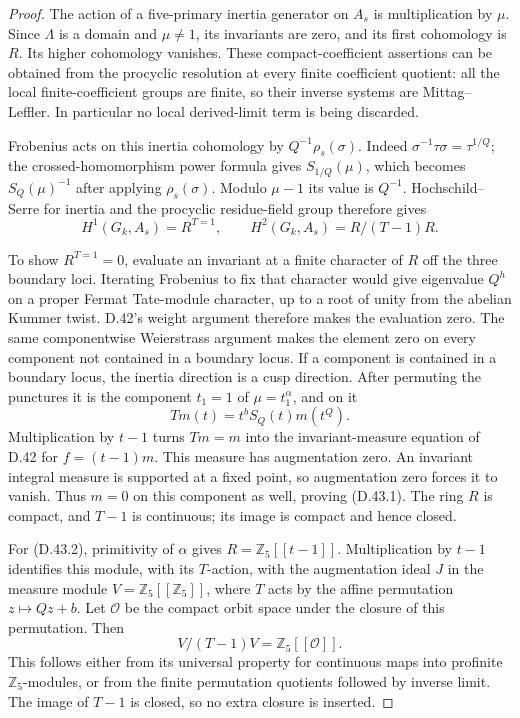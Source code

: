 \begin{proof}
The action of a five-primary inertia generator
on \(A_s\) is multiplication by \(\mu\).
Since \(\Lambda\) is a domain and \(\mu\ne1\),
its invariants are zero, and its first
cohomology is \(R\). Its higher cohomology
vanishes. These compact-coefficient assertions
can be obtained from the procyclic resolution
at every finite coefficient quotient:
all the local finite-coefficient groups are
finite, so their inverse systems are
Mittag--Leffler. In particular no local
derived-limit term is being discarded.

Frobenius acts on this inertia cohomology by
\(Q^{-1}\rho_s(\sigma)\).
Indeed \(\sigma^{-1}\tau\sigma=\tau^{1/Q}\);
the crossed-homomorphism power formula gives
\(S_{1/Q}(\mu)\), which becomes
\(S_Q(\mu)^{-1}\) after applying \(\rho_s(\sigma)\).
Modulo \(\mu-1\) its value is \(Q^{-1}\).
Hochschild--Serre for inertia and the
procyclic residue-field group therefore gives
\[
 H^1(G_k,A_s)=R^{T=1},\qquad
 H^2(G_k,A_s)=R/(T-1)R.
\]

To show \(R^{T=1}=0\), evaluate an invariant
at a finite character of \(R\) off the three
boundary loci. Iterating Frobenius to fix
that character would give eigenvalue \(Q^h\)
on a proper Fermat Tate-module character,
up to a root of unity from the abelian
Kummer twist. D.42's weight argument
therefore makes the evaluation zero.
The same componentwise Weierstrass argument
makes the element zero on every component
not contained in a boundary locus.
If a component is contained in a boundary
locus, the inertia direction is a cusp
direction. After permuting the punctures
it is the component \(t_1=1\) of
\(\mu=t_1^\alpha\), and on it
\[
                Tm(t)=t^bS_Q(t)m(t^Q).
\]
Multiplication by \(t-1\) turns \(Tm=m\)
into the invariant-measure equation of
D.42 for \(f=(t-1)m\). This measure has
augmentation zero. An invariant integral
measure is supported at a fixed point,
so augmentation zero forces it to vanish.
Thus \(m=0\) on this component as well,
proving (D.43.1). The ring \(R\) is compact,
and \(T-1\) is continuous; its image is
compact and hence closed.

For (D.43.2), primitivity of \(\alpha\)
gives \(R=\mathbb Z_5[[t-1]]\).
Multiplication by \(t-1\) identifies this
module, with its \(T\)-action, with the
augmentation ideal \(J\) in the measure
module \(V=\mathbb Z_5[[\mathbb Z_5]]\),
where \(T\) acts by the affine permutation
\(z\mapsto Qz+b\).
Let \(\mathcal O\) be the compact orbit
space under the closure of this permutation.
Then
\[
                     V/(T-1)V=\mathbb Z_5[[\mathcal O]].
                                                               \tag{D.43.3}
\]
This follows either from its universal
property for continuous maps into profinite
\(\mathbb Z_5\)-modules, or from the finite
permutation quotients followed by inverse
limit. The image of \(T-1\) is closed,
so no extra closure is inserted.


\end{proof}
